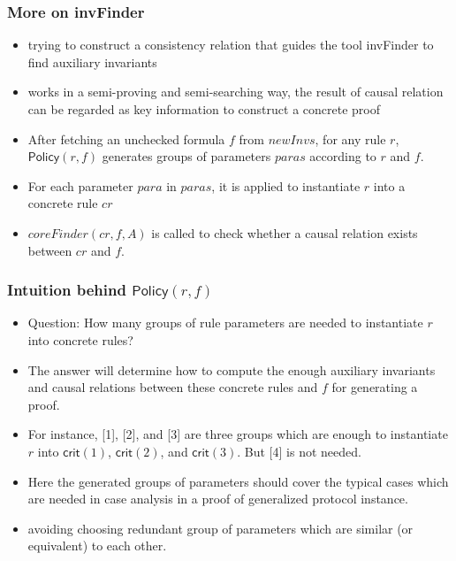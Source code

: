 \documentclass{beamer}
\newcommand{\forget}[1]{}
\begin{document}
\begin{frame}\frametitle{More on {\sf invFinder}}


\begin{itemize}
\item trying to construct a consistency relation that
guides the tool {\sf invFinder} to find auxiliary invariants

\forget{\item using an oracles that checks whether a ground
formula is an invariant in the small reference model


\item Searching not only auxiliary invariants but also causal relations

\item   protocol.tbl:  storing the searching result}

\item works in a semi-proving and semi-searching way, the result of causal relation can be regarded as key information to construct a concrete proof

\item After fetching an unchecked formula $f$ from $newInvs$, for any rule $r$, $\mathsf{Policy}(r,f)$  generates groups of parameters $paras$  according to $r$ and $f$.

\item     For each parameter $para$ in $paras$,   it is applied to instantiate $r$ into a concrete rule $cr$ 
\pause 
\item  $coreFinder(cr,  f, A)$ is called to check
 whether  a causal relation exists between $cr$ and $f$.
\end{itemize}
 \end{frame}


\begin{frame}\frametitle{Intuition behind $\mathsf{Policy}(r,f)$}


\begin{itemize}
\item Question: How many groups of rule parameters  are needed to instantiate $r$ into concrete rules?

\item The answer will determine how to compute the enough auxiliary invariants and causal relations between these concrete rules and $f$ for generating a proof.

\item For instance, [1], [2], and [3] are three groups which are enough to instantiate $r$ into $\mathsf{crit}(1)$, $\mathsf{crit}(2)$, and $\mathsf{crit}(3)$. But [4] is not needed.

\item Here the generated groups of parameters should cover the typical cases  which are needed in case analysis in a proof of generalized protocol instance.

\item avoiding choosing redundant group of parameters   which are similar  (or equivalent) to each other.
\end{itemize}
 \end{frame}
\end{document}

